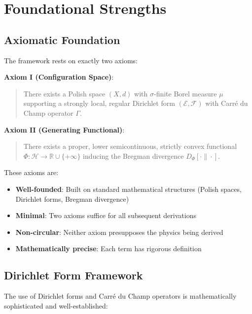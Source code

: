 \documentclass[11pt,a4paper]{article}
\newenvironment{auditstrength}[1]{%
    \begin{tcolorbox}[colback=blue!5!white,colframe=blue!75!black,title=#1]
}{\end{tcolorbox}}
\theoremstyle{definition}
\begin{document}
\section{Foundational Strengths}

\subsection{Axiomatic Foundation}

\begin{auditstrength}{Strength: Minimal Axiom Set}
The framework rests on exactly two axioms:

\textbf{Axiom I (Configuration Space)}:
\begin{quote}
There exists a Polish space $(X, d)$ with $\sigma$-finite Borel measure $\mu$ supporting a strongly local, regular Dirichlet form $(\mathcal{E}, \mathcal{F})$ with Carré du Champ operator $\Gamma$.
\end{quote}

\textbf{Axiom II (Generating Functional)}:
\begin{quote}
There exists a proper, lower semicontinuous, strictly convex functional $\Phi: \mathcal{H} \to \mathbb{R} \cup \{+\infty\}$ inducing the Bregman divergence $D_\Phi[\cdot \| \cdot]$.
\end{quote}

These axioms are:
\begin{itemize}
    \item \textbf{Well-founded}: Built on standard mathematical structures (Polish spaces, Dirichlet forms, Bregman divergence)
    \item \textbf{Minimal}: Two axioms suffice for all subsequent derivations
    \item \textbf{Non-circular}: Neither axiom presupposes the physics being derived
    \item \textbf{Mathematically precise}: Each term has rigorous definition
\end{itemize}
\end{auditstrength}

\subsection{Dirichlet Form Framework}

The use of Dirichlet forms and Carré du Champ operators is mathematically sophisticated and well-established:
\end{document}
